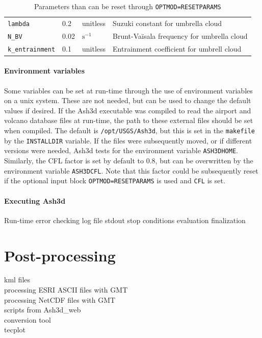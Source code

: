 \begin{table}[htbp]
\begin{center}
\begin{tabular}{| l | l | l | l |}
\texttt{lambda}            & 0.2      & unitless           &  Suzuki constant for umbrella cloud\\
\texttt{N\_BV}             & 0.02     & $\mathrm{s^{-1}}$  &  Brunt-Va\"isala frequency for umbrella cloud\\
\texttt{k\_entrainment}    & 0.1      & unitless           &  Entrainment coefficient for umbrell cloud\\
\hline
\end{tabular}
\caption{\label{tab:ResetParam}Parameters than can be reset through \texttt{OPTMOD=RESETPARAMS}}
\end{center}
\end{table}
\normalsize

\paragraph{Environment variables}
Some variables can be set at run-time through the use of environment variables on a unix
system.  These are not needed, but can be used to change the default values if desired.
If the Ash3d executable was compiled to read the airport and volcano database files at
run-time, the path to these external files should be set when compiled.  The default is
\texttt{/opt/USGS/Ash3d}, but this is set in the \texttt{makefile} by the \texttt{INSTALLDIR}
variable.  If the files were subsequently moved, or if different versions were needed,
Ash3d tests for the environment variable \texttt{ASH3DHOME}.  Similarly, the CFL factor
is set by default to 0.8, but can be overwritten by the environment variable \texttt{ASH3DCFL}.
Note that this factor could be subsequently reset if the optional input block
\texttt{OPTMOD=RESETPARAMS} is used and \texttt{CFL} is set.

\paragraph{Executing Ash3d}
Run-time error checking
log file
stdout
stop conditions evaluation
finalization

\section{Post-processing}\label{ChapUsageSecPostProc}
kml files\\
processing ESRI ASCII files with GMT\\
processing NetCDF files with GMT\\
scripts from Ash3d\_web\\
conversion tool\\
tecplot


